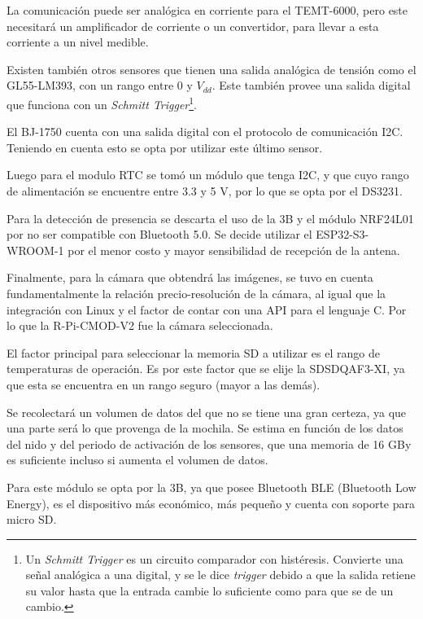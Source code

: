 La comunicación puede ser analógica en corriente para el TEMT-6000, pero este necesitará un amplificador de corriente o un convertidor, para llevar a esta corriente a un nivel medible.

Existen también otros sensores que tienen una salida analógica de tensión como el GL55-LM393, con un rango entre 0 y $V_{dd}$. Este también provee una salida digital que funciona con un \textit{Schmitt Trigger}\footnote{Un \textit{Schmitt Trigger} es un circuito comparador con histéresis. Convierte una señal analógica a una digital, y se le dice \textit{trigger} debido a que la salida retiene su valor hasta que la entrada cambie lo suficiente como para que se de un cambio.}.

El BJ-1750 cuenta con una salida digital con el protocolo de comunicación I2C. Teniendo en cuenta esto se opta por utilizar este último sensor. 

Luego para el modulo RTC se tom\'o un  m\'odulo que tenga I2C, y que cuyo rango de alimentación se encuentre entre 3.3 y 5 V, por lo que se opta por el DS3231.

Para la detección de presencia se descarta el uso de la \rpi 3B y el módulo NRF24L01 por no ser compatible con Bluetooth 5.0. Se decide utilizar el ESP32-S3-WROOM-1 por el menor costo y mayor sensibilidad de recepción de la antena.

Finalmente, para la cámara que obtendrá las imágenes, se tuvo en cuenta fundamentalmente la relación precio-resolución de la cámara, al igual que la integración con Linux y el factor de contar con una API para el lenguaje C. Por lo que la R-Pi-CMOD-V2 fue la cámara seleccionada.






El factor principal para seleccionar la memoria SD a utilizar es el rango de temperaturas de operación. Es por este factor que se elije la SDSDQAF3-XI, ya que esta se encuentra en un rango seguro (mayor a las demás).

Se recolectará un volumen de datos del que no se tiene una gran certeza, ya que una parte será lo que provenga de la mochila. Se estima en función de los datos del nido y del periodo de activación de los sensores, que una memoria de 16 GBy es suficiente incluso si aumenta el volumen de datos.


Para este módulo se opta por la \rspi 3B, ya que posee Bluetooth BLE (Bluetooth Low Energy), es el dispositivo más económico, más pequeño y cuenta con soporte para micro SD.

